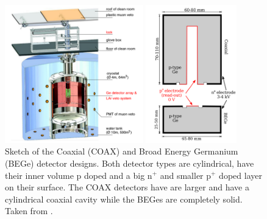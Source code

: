 \documentclass[encoding=utf8,british]{tumphthesis}
\begin{document}
\begin{figure}[t!]
	\centering
	\begin{minipage}{.45\textwidth}
		\centering
		\includegraphics[height=60mm]{./Bilder/GERDAsetupPhaseII.png}
		\caption{Sketch of the \gerda\ \PII\'s experimental setup. The germanium source and detectors are placed inside a liquid argon (LAr) tank which itself is surrounded by a water tank. Inside LAr tank a LAr veto system is installed and inside the water tank several photomultiplier are positioned for the Muon veto. Taken from \cite{collaboration_upgrade_2018}.}
		\label{fig:gerdaSetupPII}
	\end{minipage}\hfill%
	\begin{minipage}{.45\textwidth}
		\centering
		\includegraphics[height=60mm]{./Bilder/DetectorDesign.png}
		\caption{Sketch of the Coaxial (COAX) and Broad Energy Germanium (BEGe) detector designs. Both detector types are cylindrical, have their inner volume p doped and a big n$^+$ and smaller p$^+$ doped layer on their surface. The COAX detectors have are larger and have a cylindrical coaxial cavity while the BEGes are completely solid. Taken from \cite{agostini_background_2014}.}
		\label{fig:DetcDes}
	\end{minipage}
\end{figure}
\end{document}
